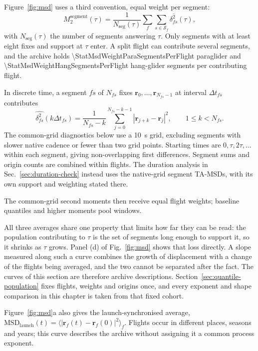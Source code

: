 Figure~\ref{fig:msd} uses a third convention, equal weight per segment:
\begin{equation}
 M_2^{\mathrm{segment}}(\tau)=\frac1{N_{\mathrm{seg}}(\tau)}
 \sum_f\sum_{s\in\mathcal S_f}\overline{\delta_{fs}^2}(\tau),
 \label{eq:segment-msd}
\end{equation}
with $N_{\mathrm{seg}}(\tau)$ the number of segments answering $\tau$.
Only segments with at least eight fixes and support at $\tau$ enter. A split flight
can contribute several segments, and the archive holds
\num{\StatMsdWeightParaSegmentsPerFlight} paraglider and
\num{\StatMsdWeightHangSegmentsPerFlight} hang-glider segments per contributing flight.

In discrete time, a segment $fs$ of $N_{fs}$ fixes
$\mathbf r_0,\ldots,\mathbf r_{N_{fs}-1}$ at interval $\Delta t_{fs}$ contributes
\begin{equation}
 \widehat{\delta_{fs}^2}(k\Delta t_{fs})
 =\frac{1}{N_{fs}-k}\sum_{j=0}^{N_{fs}-k-1}|\mathbf r_{j+k}-\mathbf r_j|^2,
 \qquad 1\le k<N_{fs}.
 \label{eq:discrete-tamsd}
\end{equation}
The common-grid diagnostics below use a \SI{10}{\second} grid, excluding segments with
slower native cadence or fewer than two grid points. Starting times are
$0,\tau,2\tau,\ldots$ within each segment, giving non-overlapping first differences.
Segment sums and origin counts are combined within flights. The duration analysis
in Sec.~\ref{sec:duration-check} instead uses the native-grid segment TA-MSDs,
with its own support and weighting stated there.

The common-grid second moments then receive equal flight weights; baseline quantiles
and higher moments pool windows.

All three averages share one property that limits how far they can be read: the
population contributing to $\tau$ is the set of segments long enough to support it,
so it shrinks as $\tau$ grows. Panel (d) of Fig.~\ref{fig:msd} shows that loss
directly. A slope measured along such a curve combines the growth of displacement
with a change of the flights being averaged, and the two cannot be separated after
the fact. The curves of this section are therefore archive descriptions.
Section~\ref{sec:quantile-population} fixes flights, weights and origins once, and
every exponent and shape comparison in this chapter is taken from that fixed
cohort.

Figure~\ref{fig:msd}a also gives the launch-synchronised average,
$\mathrm{MSD}_{\mathrm{launch}}(t)=\langle|\mathbf r_f(t)-\mathbf r_f(0)|^2\rangle_f$.
Flights occur in different places, seasons and years; this curve describes the
archive without assigning it a common process exponent.

